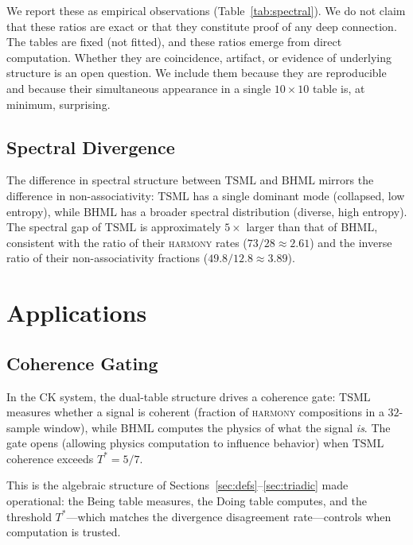 \documentclass[11pt,a4paper]{article}
\theoremstyle{definition}
\theoremstyle{remark}
\newcommand{\TSML}{\mathrm{TSML}}
\newcommand{\BHML}{\mathrm{BHML}}
\newcommand{\Tstar}{T^{*}}
\begin{document}
We report these as empirical observations (Table~\ref{tab:spectral}). We do not claim that these ratios are exact or that they constitute proof of any deep connection. The tables are fixed (not fitted), and these ratios emerge from direct computation. Whether they are coincidence, artifact, or evidence of underlying structure is an open question. We include them because they are reproducible and because their simultaneous appearance in a single $10\times 10$ table is, at minimum, surprising.

\subsection{Spectral Divergence}\label{sec:spectral-div}

The difference in spectral structure between $\TSML$ and $\BHML$ mirrors the difference in non-associativity: $\TSML$ has a single dominant mode (collapsed, low entropy), while $\BHML$ has a broader spectral distribution (diverse, high entropy). The spectral gap of $\TSML$ is approximately $5\times$ larger than that of $\BHML$, consistent with the ratio of their \textsc{harmony} rates ($73/28\approx 2.61$) and the inverse ratio of their non-associativity fractions ($49.8/12.8\approx 3.89$).

\section{Applications}\label{sec:apps}

\subsection{Coherence Gating}\label{sec:gating}

In the CK system, the dual-table structure drives a coherence gate: $\TSML$ measures whether a signal is coherent (fraction of \textsc{harmony} compositions in a $32$-sample window), while $\BHML$ computes the physics of what the signal \emph{is}. The gate opens (allowing physics computation to influence behavior) when $\TSML$ coherence exceeds $\Tstar = 5/7$.

This is the algebraic structure of Sections~\ref{sec:defs}--\ref{sec:triadic} made operational: the Being table measures, the Doing table computes, and the threshold $\Tstar$---which matches the divergence disagreement rate---controls when computation is trusted.
\end{document}
